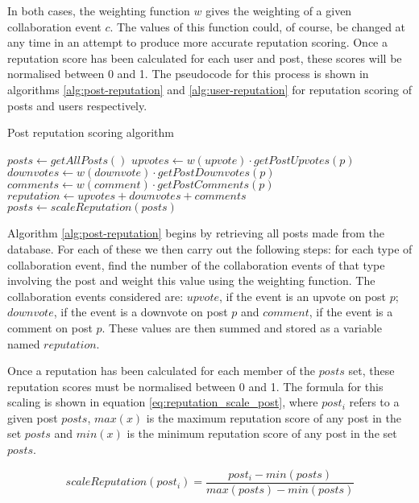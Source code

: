 \noindent
In both cases, the weighting function \(w\) gives the weighting of a given collaboration event \(c\). The values of this function could, of course, be changed at any time in an attempt to produce more accurate reputation scoring. Once a reputation score has been calculated for each user and post, these scores will be normalised between 0 and 1. The pseudocode for this process is shown in algorithms \ref{alg:post-reputation} and \ref{alg:user-reputation} for reputation scoring of posts and users respectively.

\begin{algorithm}[H]
\caption{Post reputation scoring algorithm}
\label{alg:post-reputation}
\begin{algorithmic}[1]
\State $posts\gets getAllPosts()$
	\State $upvotes\gets w(upvote)\cdot getPostUpvotes(p)$
	\State $downvotes\gets w(downvote)\cdot getPostDownvotes(p)$
	\State $comments\gets w(comment)\cdot getPostComments(p)$
	\State $reputation\gets upvotes + downvotes + comments$
\EndFor
\State $posts\gets scaleReputation(posts)$
\end{algorithmic}
\end{algorithm}

\noindent
Algorithm \ref{alg:post-reputation} begins by retrieving all posts made from the database. For each of these we then carry out the following steps: for each type of collaboration event, find the number of the collaboration events of that type involving the post and weight this value using the weighting function. The collaboration events considered are: \(upvote\), if the event is an upvote on post \(p\); \(downvote\), if the event is a downvote on post \(p\) and \(comment\), if the event is a comment on post \(p\). These values are then summed and stored as a variable named \(reputation\).

Once a reputation has been calculated for each member of the \(posts\) set, these reputation scores must be normalised between 0 and 1. The formula for this scaling is shown in equation \ref{eq:reputation_scale_post}, where $post_i$ refers to a given post \(posts\), \(max(x)\) is the maximum reputation score of any post in the set \(posts\) and $min(x)$ is the minimum reputation score of any post in the set \(posts\).

\begin{equation}
	\label{eq:reputation_scale_post}
	scaleReputation(post_i) = \frac{post_i - min(posts)}{max(posts) - min(posts)}
\end{equation}

